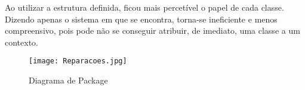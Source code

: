 \documentclass[../relatorio.tex]{subfiles}
\begin{document}
Ao utilizar a estrutura definida, ficou mais percetível o papel de cada classe.
Dizendo apenas o sistema em que se encontra, torna-se ineficiente e menos compreensivo,
pois pode não se conseguir atribuir, de imediato, uma classe a um contexto.

\begin{figure}[!ht]
    \centering
    \texttt{[image: Reparacoes.jpg]}
    \caption{Diagrama de Package}
\end{figure}
\end{document}
